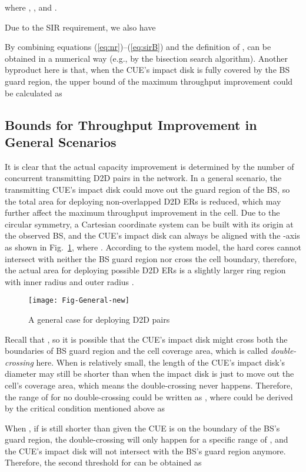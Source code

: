 \documentclass[journal, 10pt]{IEEEtran}
\begin{document}
where 
, 
, and
.

Due to the SIR requirement, we also have

By combining equations (\ref{eq:nr})--(\ref{eq:sirB}) and the definition 
of ,  can be obtained in a numerical way 
(e.g., by the bisection search algorithm). Another byproduct here is that, 
when the CUE's impact disk is fully covered by the BS guard region, the 
upper bound of the maximum throughput improvement could be calculated as 



\subsection{Bounds for Throughput Improvement in General Scenarios}
\label{sec:general bounds}

It is clear that the actual capacity improvement is determined by the
number of concurrent transmitting D2D pairs in the network. In a
general scenario, the transmitting CUE's impact disk could move out
the guard region of the BS, so the total area for deploying
non-overlapped D2D ERs is reduced, which may further affect the
maximum throughput improvement in the cell. Due to the circular
symmetry, a Cartesian coordinate system can be built with its origin
at the observed BS, and the CUE's impact disk can always be aligned
with the -axis as shown in Fig.~\ref{fig:general}, where
. 
According to the system model, the hard cores cannot intersect with
neither the BS guard region nor cross the cell boundary, therefore,
the actual area for deploying possible D2D ERs is a slightly larger
ring region with inner radius  and outer radius .
\begin{figure}[!htb]
\centering \texttt{[image: Fig-General-new]} \caption{A general case for deploying D2D pairs} \label{fig:general} 
\end{figure}
 

Recall that , so it is possible that
the CUE's impact disk might cross both the boundaries of BS guard
region and the cell coverage area, which is called
\emph{double-crossing} here. 
When  is relatively small, the length of the CUE's impact disk's
diameter may still be shorter than  when
the impact disk is just to move out the cell's coverage area, which
means the double-crossing never happens. Therefore, the range of 
for no double-crossing could be written as , where
 could be derived by the critical condition mentioned
above as 

When , if  is still shorter than 
 given the CUE is on the boundary of the BS's 
guard region, the double-crossing will only happen for a specific range of 
, and the CUE's impact disk will not intersect with the BS's 
guard region anymore. Therefore, the second threshold for  can be obtained as
\end{document}
